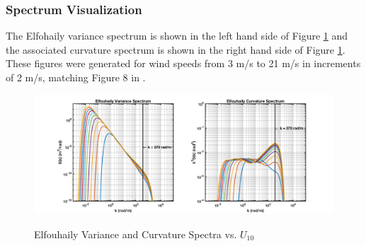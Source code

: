 \subsubsection{Spectrum Visualization}
The Elfohaily variance spectrum is shown in the left hand side of Figure \ref{os_fig:3} and the associated curvature spectrum is shown in the right hand side of Figure \ref{os_fig:3}. These figures were generated for wind speeds from 3 m/s to 21 m/s in increments of 2 m/s, matching Figure 8 in \cite{elfouhaily}.
\begin{figure}[H]
  \begin{center}
\includegraphics[width=6in]{../media/Ocean_Surface/elf_variance_curvature_spectrum.png}
  \end{center}
  \renewcommand{\baselinestretch}{1} \small\normalsize
  \begin{quote}
    \caption[Elfouhaily Variance and Curvature Spectra vs. $U_{10}$]{Elfouhaily Variance and Curvature Spectra vs. $U_{10}$\label{os_fig:3}}
  \end{quote}
\end{figure}
\renewcommand{\baselinestretch}{2} \small\normalsize

